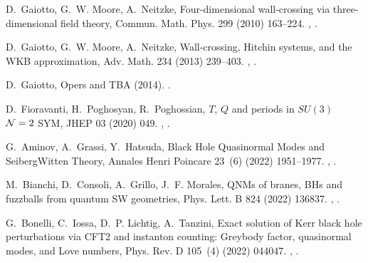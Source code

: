 \documentclass[11pt,a4paper]{elsarticle}
\numberwithin{figure}{section}
\numberwithin{table}{section}
\begin{document}
\begin{thebibliography}{10}
D.~Gaiotto, G.~W. Moore, A.~Neitzke, {Four-dimensional wall-crossing via
  three-dimensional field theory}, Commun. Math. Phys. 299 (2010) 163--224.
\newblock \href {http://arxiv.org/abs/0807.4723} {},
  \href {https://doi.org/10.1007/s00220-010-1071-2}
  {}.

D.~Gaiotto, G.~W. Moore, A.~Neitzke, {Wall-crossing, Hitchin systems, and the
  WKB approximation}, Adv. Math. 234 (2013) 239--403.
\newblock \href {http://arxiv.org/abs/0907.3987} {},
  \href {https://doi.org/10.1016/j.aim.2012.09.027}
  {}.

D.~Gaiotto, {Opers and TBA} (2014).
\newblock \href {http://arxiv.org/abs/1403.6137} {}.

D.~Fioravanti, H.~Poghosyan, R.~Poghossian, {$T$, $Q$ and periods in $SU(3)$
  ${\cal N}=2$ SYM}, JHEP 03 (2020) 049.
\newblock \href {http://arxiv.org/abs/1909.11100} {},
  \href {https://doi.org/10.1007/JHEP03(2020)049}
  {}.

G.~Aminov, A.~Grassi, Y.~Hatsuda, {Black Hole Quasinormal Modes and
  Seiberg\textendash{}Witten Theory}, Annales Henri Poincare 23~(6) (2022)
  1951--1977.
\newblock \href {http://arxiv.org/abs/2006.06111} {},
  \href {https://doi.org/10.1007/s00023-021-01137-x}
  {}.

M.~Bianchi, D.~Consoli, A.~Grillo, J.~F. Morales, {QNMs of branes, BHs and
  fuzzballs from quantum SW geometries}, Phys. Lett. B 824 (2022) 136837.
\newblock \href {http://arxiv.org/abs/2105.04245} {},
  \href {https://doi.org/10.1016/j.physletb.2021.136837}
  {}.

G.~Bonelli, C.~Iossa, D.~P. Lichtig, A.~Tanzini, {Exact solution of Kerr black
  hole perturbations via CFT2 and instanton counting: Greybody factor,
  quasinormal modes, and Love numbers}, Phys. Rev. D 105~(4) (2022) 044047.
\newblock \href {http://arxiv.org/abs/2105.04483} {},
  \href {https://doi.org/10.1103/PhysRevD.105.044047}
  {}.


\end{thebibliography}
\end{document}
